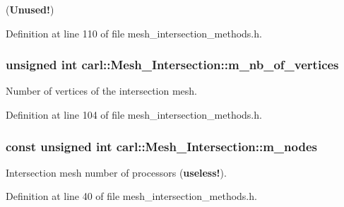 ({\bfseries Unused!}) 



Definition at line 110 of file mesh\+\_\+intersection\+\_\+methods.\+h.

\hypertarget{classcarl_1_1_mesh___intersection_ac2765c9bdf5f15878a1cff52db5551aa}{}
\subsubsection[{m\+\_\+nb\+\_\+of\+\_\+vertices}]{\setlength{\rightskip}{0pt plus 5cm}unsigned int carl\+::\+Mesh\+\_\+\+Intersection\+::m\+\_\+nb\+\_\+of\+\_\+vertices\hspace{0.3cm}{\ttfamily [protected]}}\label{classcarl_1_1_mesh___intersection_ac2765c9bdf5f15878a1cff52db5551aa}


Number of vertices of the intersection mesh. 



Definition at line 104 of file mesh\+\_\+intersection\+\_\+methods.\+h.

\hypertarget{classcarl_1_1_mesh___intersection_abd9e70d02d26302a6cc97fc4ec4990dc}{}
\subsubsection[{m\+\_\+nodes}]{\setlength{\rightskip}{0pt plus 5cm}const unsigned int carl\+::\+Mesh\+\_\+\+Intersection\+::m\+\_\+nodes\hspace{0.3cm}{\ttfamily [protected]}}\label{classcarl_1_1_mesh___intersection_abd9e70d02d26302a6cc97fc4ec4990dc}


Intersection mesh number of processors ({\bfseries useless!}). 



Definition at line 40 of file mesh\+\_\+intersection\+\_\+methods.\+h.

\hypertarget{classcarl_1_1_mesh___intersection_ab2543dd7c6f2d62561e4b75782621f43}{}
